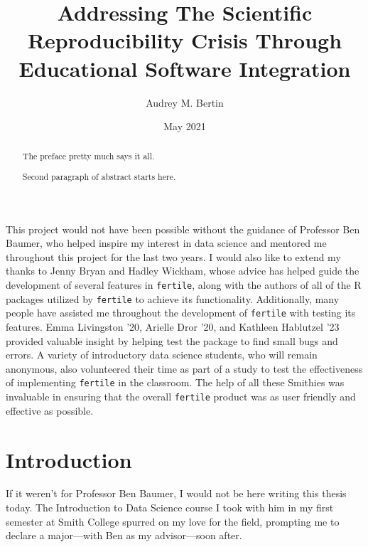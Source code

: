 \documentclass[12pt,twoside]{reedthesis}
\title{Addressing The Scientific Reproducibility Crisis Through Educational
Software Integration}
\author{Audrey M. Bertin}
\date{May 2021}
\begin{document}
  \maketitle

\frontmatter %
\pagestyle{empty} %
  \begin{acknowledgements}
    This project would not have been possible without the guidance of
    Professor Ben Baumer, who helped inspire my interest in data science and
    mentored me throughout this project for the last two years. I would also
    like to extend my thanks to Jenny Bryan and Hadley Wickham, whose advice
    has helped guide the development of several features in
    \texttt{fertile}, along with the authors of all of the R packages
    utilized by \texttt{fertile} to achieve its functionality. Additionally,
    many people have assisted me throughout the development of
    \texttt{fertile} with testing its features. Emma Livingston '20, Arielle
    Dror '20, and Kathleen Hablutzel '23 provided valuable insight by
    helping test the package to find small bugs and errors. A variety of
    introductory data science students, who will remain anonymous, also
    volunteered their time as part of a study to test the effectiveness of
    implementing \texttt{fertile} in the classroom. The help of all these
    Smithies was invaluable in ensuring that the overall \texttt{fertile}
    product was as user friendly and effective as possible.
  \end{acknowledgements}

  \hypersetup{linkcolor=black}
  \setcounter{tocdepth}{2}
  \tableofcontents


  \listoffigures
  \begin{abstract}
    The preface pretty much says it all. \par
    Second paragraph of abstract starts here.
  \end{abstract}

\mainmatter %
\pagestyle{fancyplain} %

\chapter*{Introduction}\label{introduction}

If it weren't for Professor Ben Baumer, I would not be here writing this
thesis today. The Introduction to Data Science course I took with him in
my first semester at Smith College spurred on my love for the field,
prompting me to declare a major---with Ben as my advisor---soon after.
\end{document}
